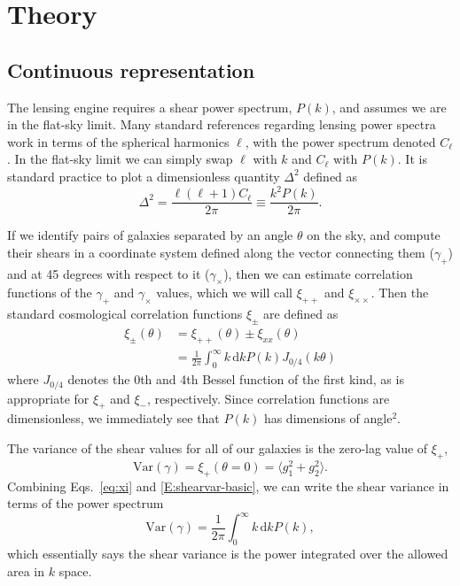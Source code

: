 \documentclass[preprint]{aastex}
\newcommand{\rmd}{\ensuremath{\mathrm{d}}}
\newcommand{\beq}{\begin{equation}}
\newcommand{\eeq}{\end{equation}}
\begin{document}
\section{Theory}\label{sect:theory}

\subsection{Continuous representation}

The lensing engine requires a shear power spectrum, $P(k)$, and
assumes we are in the flat-sky limit.  Many standard references
regarding lensing power spectra work in terms of the spherical
harmonics $\ell$, with the power spectrum denoted $C_\ell$.  In the
flat-sky limit we can simply swap $\ell$ with $k$ and $C_\ell$ with
$P(k)$.  It is standard practice to plot a dimensionless quantity
$\Delta^2$ defined as
\beq
\Delta^2 = \frac{\ell(\ell+1) C_{\ell}}{2\pi}\equiv \frac{k^2 P(k)}{2\pi}.
\eeq

If we identify pairs of galaxies separated by an angle $\theta$ on the
sky, and compute their shears in a coordinate
system defined along the vector connecting them ($\gamma_+$) and at 45
degrees with respect to it ($\gamma_\times$), then we can estimate 
correlation functions of the $\gamma_+$ and $\gamma_\times$ values,
which we will call $\xi_{++}$ and $\xi_{\times\times}$.  Then the
standard cosmological correlation functions $\xi_{\pm}$ are defined as
\begin{align}
\xi_{\pm}(\theta) &=  \xi_{++}(\theta)\pm \xi_{xx}(\theta) \\
 &= \frac{1}{2\pi}\int_0^{\infty} k\,\rmd k P(k) J_{0/4}(k\theta)  \label{eq:xi}
\end{align}
where $J_{0/4}$ denotes the 0th and 4th Bessel function of the first
kind, as is appropriate for $\xi_+$ and $\xi_-$, respectively. 
Since correlation functions are dimensionless, we immediately see that
$P(k)$ has dimensions of angle$^2$.

The variance of the shear values for all of our galaxies is the zero-lag value of $\xi_+$, 
\beq\label{E:shearvar-basic}
\mathrm{Var}(\gamma) = \xi_{+}(\theta=0) = \langle g_1^2 + g_2^2\rangle.
\eeq
Combining Eqs.~\ref{eq:xi} and \ref{E:shearvar-basic}, we can write
the shear variance in terms of the power
spectrum
\beq\label{E:shearvar}
\mathrm{Var}(\gamma) = \frac{1}{2\pi}\int_0^{\infty} k\,\rmd k P(k),
\eeq
which essentially says the shear variance is the power integrated over
the allowed area in $k$ space.
\end{document}
